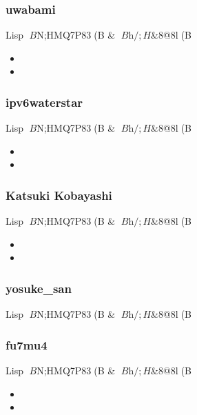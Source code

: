 \documentclass[cjk,dvipdfmx,12pt,compress,%
hyperref={bookmarks=true,bookmarksnumbered=true,bookmarksopen=false,%
colorlinks=false,%
pdftitle={$BBh(B 120 $B2s(B $B4X@>(B Debian $BJY6/2q(B},%
pdfauthor={$BARI_!&$N$,$?!&:4!9LZ!&$+$o$@!&$*$*$D$-(B},%
pdfsubject={$B;qNA(B},%
}]{beamer}
\begin{document}
{\begin{frame}[fragile]
  \frametitle{uwabami}
  \begin{block}{Lisp $B$N;HMQ7P83(B \& $B$h$/;H$&8@8l(B}
    \begin{itemize}
      \item 
      \item 
    \end{itemize}
  \end{block}
\end{frame}

\begin{frame}[fragile]
  \frametitle{ipv6waterstar}
  \begin{block}{Lisp $B$N;HMQ7P83(B \& $B$h$/;H$&8@8l(B}
    \begin{itemize}
      \item 
      \item 
    \end{itemize}
  \end{block}
\end{frame}

\begin{frame}[fragile]
  \frametitle{Katsuki Kobayashi}
  \begin{block}{Lisp $B$N;HMQ7P83(B \& $B$h$/;H$&8@8l(B}
    \begin{itemize}
      \item 
      \item 
    \end{itemize}
  \end{block}
\end{frame}

\begin{frame}[fragile]
  \frametitle{yosuke\_san}
  \begin{block}{Lisp $B$N;HMQ7P83(B \& $B$h$/;H$&8@8l(B}
  \end{block}
\end{frame}

\begin{frame}[fragile]
  \frametitle{fu7mu4}
  \begin{block}{Lisp $B$N;HMQ7P83(B \& $B$h$/;H$&8@8l(B}
    \begin{itemize}
      \item 
      \item 
    \end{itemize}
  \end{block}
\end{frame}

}
\end{document}
